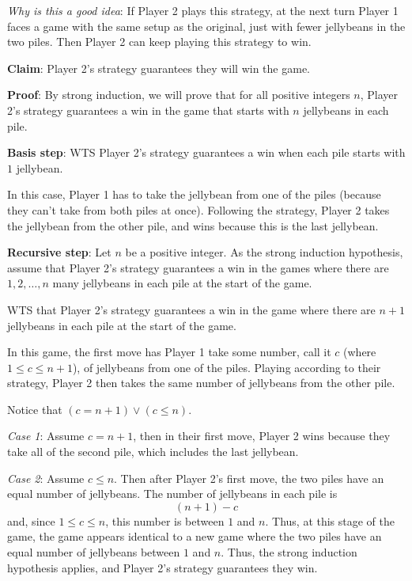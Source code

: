 \documentclass[12pt, oneside]{article}
\begin{document}
{\it Why is this a good idea}: If Player 2 plays this strategy, at the next turn
Player 1 faces a game with the same setup as the original, just with fewer
jellybeans in the two piles. Then Player 2 can keep playing this strategy to win.

{\bf Claim}: Player 2's strategy guarantees they will win the game.

{\bf Proof}: By strong induction, we will prove that for all positive 
integers $n$, Player 2's strategy guarantees a win in the game that starts with 
$n$ jellybeans in each pile.

{\bf Basis step}: WTS Player 2's strategy guarantees a win 
when each pile starts with $1$ jellybean.

In this case, Player 1 has to take the jellybean from one of the piles
(because they can't take from both piles at once).
Following the strategy, Player 2 takes the jellybean from the 
other pile, and wins because this is the last jellybean.

{\bf Recursive step}: Let $n$ be a positive integer. 
As the strong induction hypothesis, assume that
Player 2's strategy guarantees a win in the games 
where there are $1, 2, \ldots, n$ many jellybeans in each 
pile at the start of the game.

WTS that Player 2's strategy guarantees a win in the game where
there are $n+1$ jellybeans in each pile at the start of the game.

In this game, the first move has Player 1 take 
some number, call it $c$ (where $1 \leq c \leq n+1$),
of jellybeans from one of the piles. 
Playing according to their strategy, Player 2 then 
takes the same number of jellybeans from  the other pile.

Notice that $(c = n+1) \lor (c \leq n)$.

{\it Case 1}: Assume $c = n+1$, then in their first move, 
Player 2 wins because they take all of the second pile, which 
includes the last jellybean.

{\it Case 2}: Assume $c \leq n$. Then after Player 2's first move,
the two piles have an equal number of jellybeans. The number
of jellybeans in each pile is 
\[
    (n+1) - c
\]
and, since $1 \leq c \leq n$, this number is between $1$ and $n$.
Thus, at this stage of the game, the game appears identical to a new 
game where the two piles have an equal number of jellybeans between $1$
and $n$. Thus, the strong induction hypothesis applies, and Player 2's
strategy guarantees they win.

 \newpage
\end{document}
